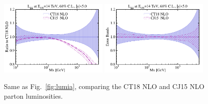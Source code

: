 \begin{figure}[!htbp]
\begin{center}
		\includegraphics[width=0.48\textwidth]{./fig/Lumi_CT18NLO_CJ15nlo/Lumi_14TeV_ym-lt-5-0_asym_20__68CL-CT18NLO_CJ15nlo__00_ggr_ect.pdf}
		\includegraphics[width=0.48\textwidth]{./fig/Lumi_CT18NLO_CJ15nlo/Lumi_14TeV_ym-lt-5-0_asym_20__68CL-CT18NLO_CJ15nlo__00_gg2_ect.pdf}

	\end{center}
	\vspace{-2ex}
	\caption{Same as Fig.~\ref{fig:lumia}, comparing the CT18 NLO and CJ15 NLO parton luminosities.
	}
\label{fig:lumiCT18NLOvsothers}
\end{figure}

\clearpage

